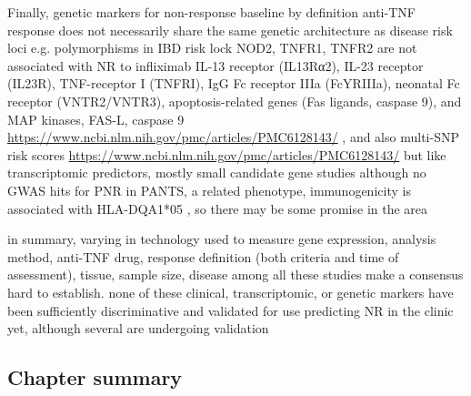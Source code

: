 \begin{outline}
\1 Finally, genetic markers for non-response \autocite{flamant2018InflammatoryBowelDisease}
    \2 baseline by definition
    \2 anti-TNF response does not necessarily share the same genetic architecture as disease risk loci e.g. polymorphisms in IBD risk lock NOD2, TNFR1, TNFR2 are not associated with NR to infliximab \autocite{digby-bell2019InterrogatingHostImmunity,noor2020PersonalisedMedicineCrohn}
    \2 IL-13 receptor (IL13Rα2), IL-23 receptor (IL23R), TNF-receptor I (TNFRI), IgG Fc receptor IIIa (FcYRIIIa), neonatal Fc receptor (VNTR2/VNTR3), apoptosis-related genes (Fas ligands, caspase 9), and MAP kinases, FAS-L, caspase 9 \url{https://www.ncbi.nlm.nih.gov/pmc/articles/PMC6128143/} \autocite{flamant2018InflammatoryBowelDisease}, and also multi-SNP risk scores \url{https://www.ncbi.nlm.nih.gov/pmc/articles/PMC6128143/}
    \2 but like transcriptomic predictors, mostly small candidate gene studies
    \2 although no GWAS hits for PNR in PANTS, a related phenotype, immunogenicity is associated with HLA-DQA1*05 \autocite{sazonovs2019HLADQA105Carriage}, so there may be some promise in the area

\1 in summary, varying in technology used to measure gene expression, analysis method, anti-TNF drug, response definition (both criteria and time of assessment), tissue, sample size, disease among all these studies make a consensus hard to establish.
    \2 none of these clinical, transcriptomic, or genetic markers have been sufficiently discriminative and validated for use predicting NR in the clinic yet, although several are undergoing validation \autocite{noor2020PersonalisedMedicineCrohn}

\subsection{Chapter summary}


\end{outline}
